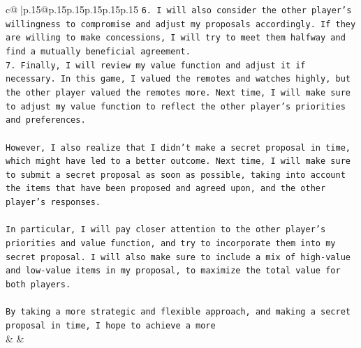 \documentclass{article}
\begin{document}
{\begin{supertabular}{c@{$\;$}|p{.15\linewidth}@{}p{.15\linewidth}p{.15\linewidth}p{.15\linewidth}p{.15\linewidth}p{.15\linewidth}}
{{{\texttt{6.  I will also consider the other player's willingness to compromise and adjust my proposals accordingly. If they are willing to make concessions, I will try to meet them halfway and find a mutually beneficial agreement.} \\
\texttt{7.  Finally, I will review my value function and adjust it if necessary. In this game, I valued the remotes and watches highly, but the other player valued the remotes more. Next time, I will make sure to adjust my value function to reflect the other player's priorities and preferences.} \\
\\ 
\texttt{However, I also realize that I didn't make a secret proposal in time, which might have led to a better outcome. Next time, I will make sure to submit a secret proposal as soon as possible, taking into account the items that have been proposed and agreed upon, and the other player's responses.} \\
\\ 
\texttt{In particular, I will pay closer attention to the other player's priorities and value function, and try to incorporate them into my secret proposal. I will also make sure to include a mix of high{-}value and low{-}value items in my proposal, to maximize the total value for both players.} \\
\\ 
\texttt{By taking a more strategic and flexible approach, and making a secret proposal in time, I hope to achieve a more} \\
            }
        }
    }
    & & \\ \\


\end{supertabular}}
\end{document}
